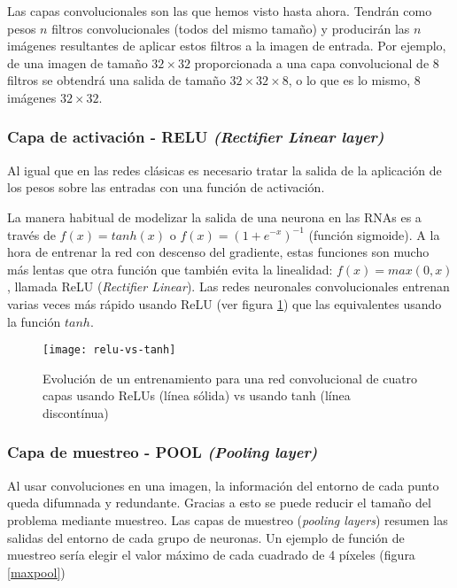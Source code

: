 Las capas convolucionales son las que hemos visto hasta ahora. Tendrán como pesos $n$ filtros convolucionales (todos del mismo tamaño) y producirán las $n$ imágenes resultantes de aplicar estos filtros a la imagen de entrada. Por ejemplo, de una imagen de tamaño $32\times 32$ proporcionada a una capa convolucional de 8 filtros se obtendrá una salida de tamaño $32 \times 32 \times 8$, o lo que es lo mismo, 8 imágenes $32 \times 32$.

\subsubsection{Capa de activación - RELU \textit{(Rectifier Linear layer)}}
\label{sec:relu}

Al igual que en las redes clásicas es necesario tratar la salida de la aplicación de los pesos sobre las entradas con una función de activación. 

La manera habitual de modelizar la salida de una neurona en las RNAs es a través de $f(x) = tanh(x)$ o $f(x) = (1 + e^{-x})^{-1}$ (función sigmoide). A la hora de entrenar la red con descenso del gradiente, estas funciones son mucho más lentas que otra función que también evita la linealidad: $f(x) = max(0, x)$, llamada ReLU (\textit{Rectifier Linear}). Las redes neuronales convolucionales entrenan varias veces más rápido usando ReLU (ver figura \ref{relu-vs-tanh}) que las equivalentes usando la función $tanh$.

\begin{figure}
    \centering
    \caption{Evolución de un entrenamiento para una red convolucional de cuatro capas usando ReLUs (línea sólida) vs usando tanh (línea discontínua) \parencite{krizhevsky2012imagenet}}
  \label{relu-vs-tanh}
  \texttt{[image: relu-vs-tanh]}
\end{figure}

\subsubsection{Capa de muestreo - POOL \textit{(Pooling layer)}}

Al usar convoluciones en una imagen, la información del entorno de cada punto queda difumnada y redundante. Gracias a esto se puede reducir el tamaño del problema mediante muestreo. Las capas de muestreo (\textit{pooling layers}) resumen las salidas del entorno de cada grupo de neuronas. Un ejemplo de función de muestreo sería elegir el valor máximo de cada cuadrado de 4 píxeles (figura \ref{maxpool})

